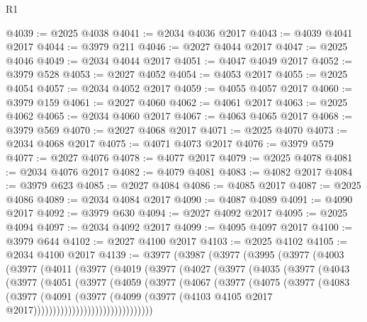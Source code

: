 \begin{lexlean}{R1}
\begin{coremodule}
@4039 := @2025 @4038
@4041 := @2034 @4036 @2017
@4043 := @4039 @4041 @2017
@4044 := @3979 @211
@4046 := @2027 @4044 @2017
@4047 := @2025 @4046
@4049 := @2034 @4044 @2017
@4051 := @4047 @4049 @2017
@4052 := @3979 @528
@4053 := @2027 @4052
@4054 := @4053 @2017
@4055 := @2025 @4054
@4057 := @2034 @4052 @2017
@4059 := @4055 @4057 @2017
@4060 := @3979 @159
@4061 := @2027 @4060
@4062 := @4061 @2017
@4063 := @2025 @4062
@4065 := @2034 @4060 @2017
@4067 := @4063 @4065 @2017
@4068 := @3979 @569
@4070 := @2027 @4068 @2017
@4071 := @2025 @4070
@4073 := @2034 @4068 @2017
@4075 := @4071 @4073 @2017
@4076 := @3979 @579
@4077 := @2027 @4076
@4078 := @4077 @2017
@4079 := @2025 @4078
@4081 := @2034 @4076 @2017
@4082 := @4079 @4081
@4083 := @4082 @2017
@4084 := @3979 @623
@4085 := @2027 @4084
@4086 := @4085 @2017
@4087 := @2025 @4086
@4089 := @2034 @4084 @2017
@4090 := @4087 @4089
@4091 := @4090 @2017
@4092 := @3979 @630
@4094 := @2027 @4092 @2017
@4095 := @2025 @4094
@4097 := @2034 @4092 @2017
@4099 := @4095 @4097 @2017
@4100 := @3979 @644
@4102 := @2027 @4100 @2017
@4103 := @2025 @4102
@4105 := @2034 @4100 @2017
@4139 := @3977
    (@3987
      (@3977
        (@3995
          (@3977
            (@4003
              (@3977
                (@4011
                  (@3977
                    (@4019
                      (@3977
                        (@4027
                          (@3977
                            (@4035
                              (@3977
                                (@4043
                                  (@3977
                                    (@4051
                                      (@3977
                                        (@4059
                                          (@3977
                                            (@4067
                                              (@3977
                                                (@4075
                                                  (@3977
                                                    (@4083
                                                      (@3977
                                                        (@4091
                                                          (@3977
                                                            (@4099
                                                              (@3977
                                                                (@4103
                                                                  @4105
                                                                  @2017
                                                                  @2017)))))))))))))))))))))))))))))))

\end{coremodule}
\end{lexlean}
